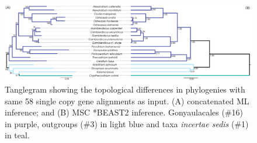 \documentclass[12pt]{article}
\begin{document}
\begin{figure} 
\includegraphics[scale=.3]{figures/MSC-BI_vs_singlecopy-concat-ML.png} 
\caption{Tanglegram showing the topological differences in phylogenies with same 58 single copy gene alignments as input. (A) concatenated ML inference; and (B) MSC *BEAST2 inference. Gonyaulacales (\#16) in purple, outgroups (\#3) in light blue and taxa \textit{incertae sedis} (\#1) in teal.} 
\label{fig:tangleconcatML}
\end{figure} 
\FloatBarrier

\end{document}
